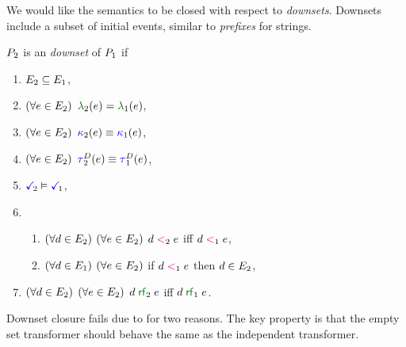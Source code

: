 We would like the semantics to be closed with respect to \emph{downsets}.
Downsets include a subset of initial events, similar to \emph{prefixes} for
strings.
\begin{definition}
  \label{def:downset}
  $P_2$ is an \emph{downset} of $P_1$ if
  \begin{multicols}{2}
    \begin{enumerate}
    \item $E_2\subseteq E_1$,
    \item $(\forall e\in E_2)$ $\labelingAct_2(\aEv)=\labelingAct_1(\aEv)$,
    \item $(\forall e\in E_2)$ ${\color{blue}\kappa}_2(e)\mathrel{\equiv}{\color{blue}\kappa}_1(e)$,
    \item $(\forall e\in E_2)$ $\aTr[2]{\bEvs}{\aEv}\riff\aTr[1]{\bEvs}{\aEv}$,
    \item $\aTerm[2] \rimplies \aTerm[1]$,
    \item[] 
      \begin{enumerate}[leftmargin=0pt]
      \item $(\forall d\in E_2)$ $(\forall e\in E_2)$ $d\mathrel{{\color{magenta}<}}_2e$ iff $d\mathrel{{\color{magenta}<}}_1e$,
      \item $(\forall d\in E_1)$ $(\forall e\in E_2)$ if
        $d\mathrel{{\color{magenta}<}}_1e$ then $d\in E_2$,
      \end{enumerate}
    \item $(\forall d\in E_2)$ $(\forall e\in E_2)$ $\bEv\rrfx_2\aEv$ iff $\bEv\rrfx_1\aEv$.
    \end{enumerate}
  \end{multicols}
\end{definition}

Downset closure fails due to for two reasons.  The key property is that the
empty set transformer should behave the same as the independent transformer.

